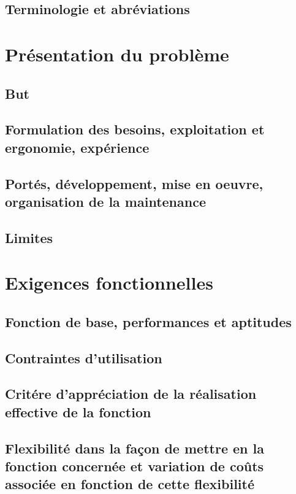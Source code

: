     \subsection{Terminologie et abréviations}
    
\section{Présentation du problème}

    \subsection{But}
    
    \subsection{Formulation des besoins, exploitation et ergonomie, expérience}
    
    \subsection{Portés, développement, mise en oeuvre, organisation de la maintenance}
    
    \subsection{Limites}

\section{Exigences fonctionnelles}

    \subsection{Fonction de base, performances et aptitudes}

    \subsection{Contraintes d'utilisation}
    
    \subsection{Critére d'appréciation de la réalisation effective de la fonction}
    
    \subsection{Flexibilité dans la façon de mettre en \oeuvre la fonction concernée et variation de coûts associée en fonction de cette flexibilité}

